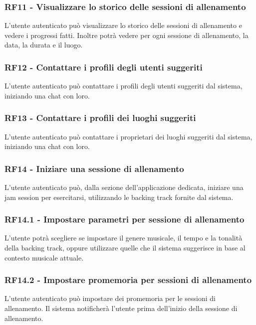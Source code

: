 \documentclass[12pt, a4paper]{article}
\begin{document}
\subsubsection{RF11 - Visualizzare lo storico delle sessioni di allenamento}

L'utente autenticato può visualizzare lo storico delle sessioni di allenamento e vedere i progressi fatti. Inoltre potrà vedere per ogni sessione di allenamento, la data, la durata e il luogo.

\subsubsection{RF12 - Contattare i profili degli utenti suggeriti}

L'utente autenticato può contattare i profili degli utenti suggeriti dal sistema, iniziando una chat con loro.

\subsubsection{RF13 - Contattare i profili dei luoghi suggeriti}

L'utente autenticato può contattare i proprietari dei luoghi suggeriti dal sistema, iniziando una chat con loro.

\subsubsection{RF14 - Iniziare una sessione di allenamento}

L'utente autenticato può, dalla sezione dell'applicazione dedicata, iniziare una jam session per esercitarsi, utilizzando le backing track fornite dal sistema.

\subsubsection{RF14.1 - Impostare parametri per sessione di allenamento}
L'utente potrà scegliere se impostare il genere musicale, il tempo e la tonalità della backing track, oppure utilizzare quelle che il sistema suggerisce in base al contesto musicale attuale.

\subsubsection{RF14.2 - Impostare promemoria per sessioni di allenamento}

L'utente autenticato può impostare dei promemoria per le sessioni di allenamento. Il sistema notificherà l'utente prima dell'inizio della sessione di allenamento.
\end{document}
